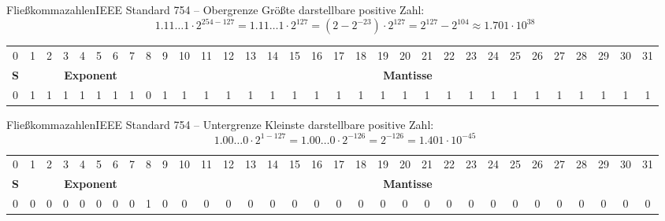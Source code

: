 \documentclass[xelatex,aspectratio=169]{beamer}
\begin{document}
\begin{frame}{Fließkommazahlen}{IEEE Standard 754 -- Obergrenze}
  Größte darstellbare positive Zahl:
  \[1.11 \ldots 1 \cdot 2^{254-127} = 1.11 \ldots 1 \cdot 2^{127} = (2 - 2^{-23}) \cdot 2^{127} = 2^{127} - 2^{104}
    \approx 1.701 \cdot 10^{38}\]

  \setlength{\tabcolsep}{0.2em}
  \begin{tabular}{c|cccccccc|ccccccccccccccccccccccc}
    \toprule
    0                               & 1                                      & 2                                      & 3 & 4 & 5 & 6 & 7 & 8 & 9 & 10 & 11 & 12 & 13 & 14 & 15 & 16 & 17 & 18 & 19 & 20 & 21 & 22 & 23 & 24 & 25 & 26 & 27 & 28 & 29 & 30 & 31 \\
    \multicolumn{1}{c|}{\textbf{S}} & \multicolumn{8}{c|}{\textbf{Exponent}} & \multicolumn{23}{c}{\textbf{Mantisse}}                                                                                                                                           \\
    \midrule
    0                               & 1                                      & 1                                      & 1 & 1 & 1 & 1 & 1 & 0 & 1 & 1  & 1  & 1  & 1  & 1  & 1  & 1  & 1  & 1  & 1  & 1  & 1  & 1  & 1  & 1  & 1  & 1  & 1  & 1  & 1  & 1  & 1  \\
    \bottomrule
  \end{tabular}

\end{frame}

\begin{frame}{Fließkommazahlen}{IEEE Standard 754 -- Untergrenze}
  Kleinste darstellbare positive Zahl:
  \[1.00 \ldots0 \cdot 2^{1-127} = 1.00 \ldots0 \cdot 2^{-126} = 2^{-126} = 1.401 \cdot 10^{-45}\]

  \setlength{\tabcolsep}{0.2em}
  \begin{tabular}{c|cccccccc|ccccccccccccccccccccccc}
    \toprule
    0                               & 1                                      & 2                                      & 3 & 4 & 5 & 6 & 7 & 8 & 9 & 10 & 11 & 12 & 13 & 14 & 15 & 16 & 17 & 18 & 19 & 20 & 21 & 22 & 23 & 24 & 25 & 26 & 27 & 28 & 29 & 30 & 31 \\
    \multicolumn{1}{c|}{\textbf{S}} & \multicolumn{8}{c|}{\textbf{Exponent}} & \multicolumn{23}{c}{\textbf{Mantisse}}                                                                                                                                           \\
    \midrule
    0                               & 0                                      & 0                                      & 0 & 0 & 0 & 0 & 0 & 1 & 0 & 0  & 0  & 0  & 0  & 0  & 0  & 0  & 0  & 0  & 0  & 0  & 0  & 0  & 0  & 0  & 0  & 0  & 0  & 0  & 0  & 0  & 0  \\
    \bottomrule
  \end{tabular}
\end{frame}
\end{document}
